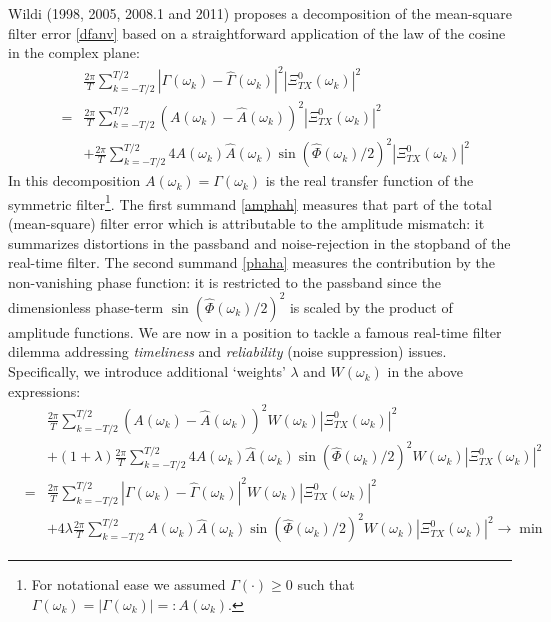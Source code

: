 \documentclass[11pt]{article}
\begin{document}
Wildi (1998, 2005, 2008.1 and 2011) proposes a decomposition of the mean-square filter error \ref{dfanv} based on a straightforward application of the law of the cosine in the complex plane:
\begin{eqnarray}
&&\frac{2\pi}{T} \sum_{k=-T/2}^{T/2}
|\Gamma(\omega_k)-\hat{\Gamma}(\omega_k)|^2 \left|\Xi_{TX}^0(\omega_k)\right|^2\nonumber\\
&=&\frac{2\pi}{ T} \sum_{k=-T/2}^{T/2}
(A(\omega_k)-\hat{A}(\omega_k))^2\left|\Xi_{TX}^0(\omega_k)\right|^2\label{amphah}\\
&&+\frac{2\pi}{ T} \sum_{k=-T/2}^{T/2}
4A(\omega_k)\hat{A}(\omega_k)\sin(\hat{\Phi}(\omega_k)/2)^2
\left|\Xi_{TX}^0(\omega_k)\right|^2\label{phaha}
\end{eqnarray}
In this decomposition $A(\omega_k)=\Gamma(\omega_k)$ is the real transfer function of the symmetric filter\footnote{For notational ease we assumed $\Gamma(\cdot)\geq 0$ such that $\Gamma(\omega_k)=|\Gamma(\omega_k)|=:A(\omega_k)$.}. The first summand \ref{amphah} measures that part of the total (mean-square) filter error which is attributable to the amplitude mismatch: it summarizes distortions in the passband and noise-rejection in the stopband of the real-time filter. The second summand \ref{phaha} measures the contribution by the non-vanishing phase function: it is restricted to the passband since the dimensionless phase-term $\sin(\hat{\Phi}(\omega_k)/2)^2$ is scaled by the product of amplitude functions. We are now in a position to tackle a famous real-time filter dilemma addressing \emph{timeliness} and \emph{reliability} (noise suppression) issues. Specifically, we introduce additional `weights' $\lambda$ and $W(\omega_k)$ in the above expressions:
\begin{eqnarray} &&\frac{2\pi}{ T} \sum_{k=-T/2}^{T/2}
(A(\omega_k)-\hat{A}(\omega_k))^2W(\omega_k) \left|\Xi_{TX}^0(\omega_k)\right|^2\label{amp}\\
&&+(1+\lambda)\frac{2\pi}{ T} \sum_{k=-T/2}^{T/2}
4A(\omega_k)\hat{A}(\omega_k)\sin(\hat{\Phi}(\omega_k)/2)^2
W(\omega_k)\left|\Xi_{TX}^0(\omega_k)\right|^2\label{pha}\\
&=&\frac{2\pi}{T} \sum_{k=-T/2}^{T/2}
|\Gamma(\omega_k)-\hat{\Gamma}(\omega_k)|^2 W(\omega_k)\left|\Xi_{TX}^0(\omega_k)\right|^2\nonumber\\
&&+4\lambda\frac{2\pi}{ T} \sum_{k=-T/2}^{T/2}
A(\omega_k)\hat{A}(\omega_k)\sin(\hat{\Phi}(\omega_k)/2)^2
W(\omega_k)\left|\Xi_{TX}^0(\omega_k)\right|^2\to\min\label{dfatp}
\end{eqnarray}
\end{document}
